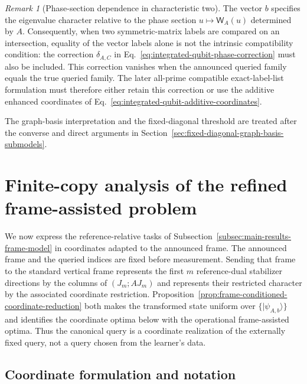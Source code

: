 \documentclass[11pt]{article}
\newcommand{\1}{\mathbf 1}
\newcommand{\ket}[1]{\lvert #1\rangle}
\theoremstyle{plain}
\theoremstyle{definition}
\theoremstyle{remark}
\newtheorem{remark}[theorem]{Remark}
\begin{document}
\begin{remark}[Phase-section dependence in characteristic two]
\label{rem:integrated-qubit-phase-section-dependent-character}
The vector $b$ specifies the eigenvalue character relative to the
phase section $u\mapsto\mathsf W_A(u)$ determined by $A$.  Consequently, when two symmetric-matrix labels are compared on an intersection, equality of the vector labels alone
is not the intrinsic compatibility condition: the correction
$\delta_{A,C}$ in Eq.~\eqref{eq:integrated-qubit-phase-correction} must also be
included.  This correction vanishes when the announced queried family equals
the true queried family.  The later all-prime compatible exact-label-list formulation must
therefore either retain this correction or use the additive enhanced
coordinates of Eq.~\eqref{eq:integrated-qubit-additive-coordinates}.
\end{remark}

The graph-basis interpretation and the fixed-diagonal threshold are treated after the converse and direct arguments in Section~\ref{sec:fixed-diagonal-graph-basis-submodels}.

\section{Finite-copy analysis of the refined frame-assisted problem}
\label{sec:partial-learning}

We now express the reference-relative tasks of Subsection~\ref{subsec:main-results-frame-model} in coordinates adapted to the announced frame.  The announced frame and the
queried indices are fixed before measurement.  Sending that frame to the
standard vertical frame represents the first $m$ reference-dual stabilizer
directions by the columns of $(J_m;AJ_m)$ and represents their restricted
character by the associated coordinate restriction.  Proposition~\ref{prop:frame-conditioned-coordinate-reduction} both makes the
transformed state uniform over $\{\ket{\psi_{A,b}}\}$ and identifies the
coordinate optima below with the operational frame-assisted optima.  Thus the
canonical query is a coordinate realization of the externally fixed query, not
a query chosen from the learner's data.

\subsection{Coordinate formulation and notation}
\label{subsec:finite-copy-coordinate-notation}
\end{document}
